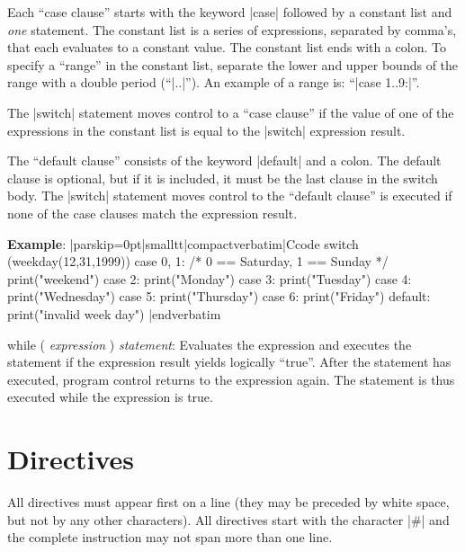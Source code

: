         Each ``case clause'' starts with the keyword |case| followed by a
        constant list and {\it one\/} statement. The constant list is a series
        of expressions, separated by comma's, that each evaluates to a constant
        value. The constant list ends with a colon. To specify a ``range''
        in the constant list, separate the lower and upper bounds of the
        range with a double period (``|..|''). An example of a range is:
        ``|case 1..9:|''.

        The |switch| statement moves control to a ``case clause'' if the value
        of one of the expressions in the constant list is equal to the
        |switch| expression result.

        The ``default clause'' consists of the keyword |default| and a colon.
        The default clause is optional, but if it is included, it must be
        the last clause in the switch body. The |switch| statement moves
        control to the ``default clause'' is executed if none of the case
        clauses match the expression result.

        {\bf Example}:
\verbatim|parskip=0pt|smalltt|compactverbatim|Ccode
switch (weekday(12,31,1999))
    {
    case 0, 1:          /* 0 == Saturday, 1 == Sunday */
        print("weekend")
    case 2:
        print("Monday")
    case 3:
        print("Tuesday")
    case 4:
        print("Wednesday")
    case 5:
        print("Thursday")
    case 6:
        print("Friday")
    default:
        print("invalid week day")
    }
|endverbatim


\item while ( {\it expression\/} ) {\it statement\/}: 
        \noindent{}%
        Evaluates the expression and executes the statement if the expression
        result yields logically ``true''. After the statement has executed,
        program control returns to the expression again. The statement is thus
        executed while the expression is true.
\endlist
{}


\chapter{Directives}
 

All directives must appear first on a line (they may be preceded by white
space, but not by any other characters). All directives start with the
character |#| and the complete instruction may not span more than one line.


